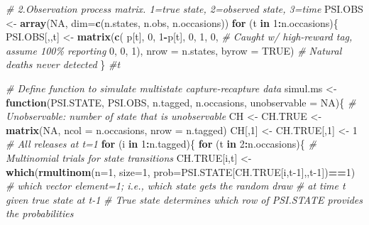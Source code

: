\documentclass[
]{krantz}
\makeatletter
\newenvironment{Shaded}{\begin{snugshade}}{\end{snugshade}}
\newcommand{\AttributeTok}[1]{\textcolor[rgb]{0.27,0.27,0.27}{#1}}
\newcommand{\CommentTok}[1]{\textcolor[rgb]{0.37,0.37,0.37}{\textit{#1}}}
\newcommand{\ConstantTok}[1]{\textcolor[rgb]{0.37,0.37,0.37}{#1}}
\newcommand{\ControlFlowTok}[1]{\textcolor[rgb]{0.27,0.27,0.27}{\textbf{#1}}}
\newcommand{\DecValTok}[1]{\textcolor[rgb]{0.06,0.06,0.06}{#1}}
\newcommand{\FunctionTok}[1]{\textcolor[rgb]{0.27,0.27,0.27}{\textbf{#1}}}
\newcommand{\NormalTok}[1]{#1}
\newcommand{\OtherTok}[1]{\textcolor[rgb]{0.37,0.37,0.37}{#1}}
\newcommand{\SpecialCharTok}[1]{\textcolor[rgb]{0.43,0.43,0.43}{\textbf{#1}}}
\newenvironment{kframe}{%
\medskip{}
\setlength{\fboxsep}{.8em}
 \def\at@end@of@kframe{}%
 \ifinner\ifhmode%
  \def\at@end@of@kframe{\end{minipage}}%
  \begin{minipage}{\columnwidth}%
 \fi\fi%
 \def\FrameCommand##1{\hskip\@totalleftmargin \hskip-\fboxsep
 \colorbox{shadecolor}{##1}\hskip-\fboxsep
     \hskip-\linewidth \hskip-\@totalleftmargin \hskip\columnwidth}%
 \MakeFramed {\advance\hsize-\width
   \@totalleftmargin\z@ \linewidth\hsize
   \@setminipage}}%
 {\par\unskip\endMakeFramed%
 \at@end@of@kframe}
\renewenvironment{Shaded}{\begin{kframe}}{\end{kframe}}
\makeatother
\begin{document}
\begin{Shaded}
\begin{Highlighting}[]
\CommentTok{\# 2.Observation process matrix.  1=true state, 2=observed state, 3=time}
\NormalTok{PSI.OBS }\OtherTok{\textless{}{-}} \FunctionTok{array}\NormalTok{(}\ConstantTok{NA}\NormalTok{, }\AttributeTok{dim=}\FunctionTok{c}\NormalTok{(n.states, n.obs, n.occasions))}
   \ControlFlowTok{for}\NormalTok{ (t }\ControlFlowTok{in} \DecValTok{1}\SpecialCharTok{:}\NormalTok{n.occasions)\{}
\NormalTok{      PSI.OBS[,,t] }\OtherTok{\textless{}{-}} \FunctionTok{matrix}\NormalTok{(}\FunctionTok{c}\NormalTok{(}
\NormalTok{      p[t], }\DecValTok{0}\NormalTok{, }\DecValTok{1}\SpecialCharTok{{-}}\NormalTok{p[t],}
      \DecValTok{0}\NormalTok{,  }\DecValTok{1}\NormalTok{, }\DecValTok{0}\NormalTok{,  }\CommentTok{\# Caught w/ high{-}reward tag, assume 100\% reporting}
      \DecValTok{0}\NormalTok{, }\DecValTok{0}\NormalTok{, }\DecValTok{1}\NormalTok{), }\AttributeTok{nrow =}\NormalTok{ n.states, }\AttributeTok{byrow =} \ConstantTok{TRUE}\NormalTok{)  }\CommentTok{\# Natural deaths never detected}
\NormalTok{      \} }\CommentTok{\#t}

\CommentTok{\# Define function to simulate multistate capture{-}recapture data}
\NormalTok{simul.ms }\OtherTok{\textless{}{-}} \ControlFlowTok{function}\NormalTok{(PSI.STATE, PSI.OBS, n.tagged, n.occasions, }\AttributeTok{unobservable =} \ConstantTok{NA}\NormalTok{)\{}
   \CommentTok{\# Unobservable: number of state that is unobservable}
\NormalTok{   CH }\OtherTok{\textless{}{-}}\NormalTok{ CH.TRUE }\OtherTok{\textless{}{-}} \FunctionTok{matrix}\NormalTok{(}\ConstantTok{NA}\NormalTok{, }\AttributeTok{ncol =}\NormalTok{ n.occasions, }\AttributeTok{nrow =}\NormalTok{ n.tagged)}
\NormalTok{   CH[,}\DecValTok{1}\NormalTok{] }\OtherTok{\textless{}{-}}\NormalTok{ CH.TRUE[,}\DecValTok{1}\NormalTok{] }\OtherTok{\textless{}{-}} \DecValTok{1} \CommentTok{\# All releases at t=1}
   \ControlFlowTok{for}\NormalTok{ (i }\ControlFlowTok{in} \DecValTok{1}\SpecialCharTok{:}\NormalTok{n.tagged)\{}
     \ControlFlowTok{for}\NormalTok{ (t }\ControlFlowTok{in} \DecValTok{2}\SpecialCharTok{:}\NormalTok{n.occasions)\{}
         \CommentTok{\# Multinomial trials for state transitions}
\NormalTok{         CH.TRUE[i,t] }\OtherTok{\textless{}{-}} \FunctionTok{which}\NormalTok{(}\FunctionTok{rmultinom}\NormalTok{(}\AttributeTok{n=}\DecValTok{1}\NormalTok{, }\AttributeTok{size=}\DecValTok{1}\NormalTok{,}
                                         \AttributeTok{prob=}\NormalTok{PSI.STATE[CH.TRUE[i,t}\DecValTok{{-}1}\NormalTok{],,t}\DecValTok{{-}1}\NormalTok{])}\SpecialCharTok{==}\DecValTok{1}\NormalTok{)}
         \CommentTok{\# which vector element=1; i.e., which state gets the random draw}
         \CommentTok{\# at time t given true state at t{-}1}
         \CommentTok{\# True state determines which row of PSI.STATE provides the probabilities}


\end{Highlighting}
\end{Shaded}
\end{document}
